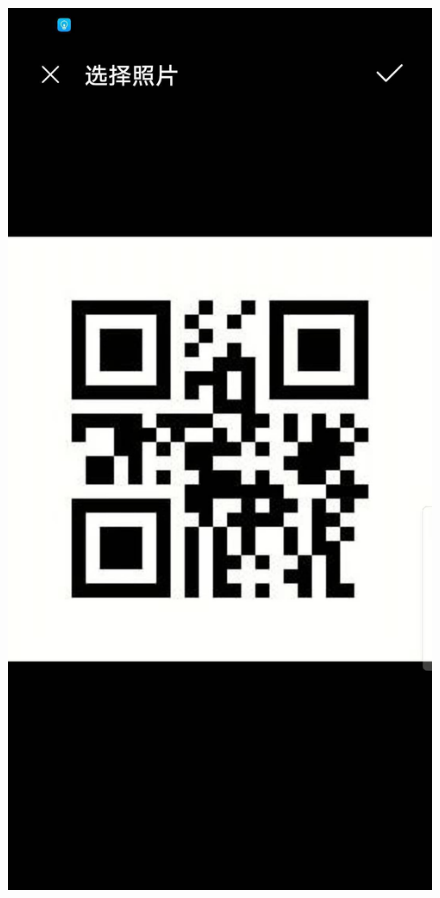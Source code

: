 \documentclass[12pt, a4paper]{article}
\theoremstyle{definition}
\begin{document}
\begin{figure}[htbp]
\begin{minipage}[t]{0.2\linewidth}
		\end{minipage}
		\begin{minipage}[t]{0.2\linewidth}
		\centering
		\includegraphics[width=\linewidth]{6-6.jpeg}

\end{minipage}
\end{figure}
\end{document}
